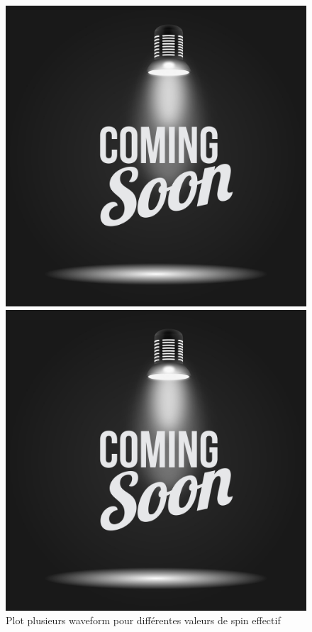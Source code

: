\begin{figure}
\begin{minipage}{0.45\linewidth}
    \includegraphics[width=\linewidth]{placeholder.png}
    \caption{Plot plusieurs waveform pour différentes valeurs de spin effectif}
    \label{fig:waveform_spinEff}
  \end{minipage}
  \hfill
  \begin{minipage}{0.45\linewidth}
    \includegraphics[width=\linewidth]{placeholder.png}

\end{minipage}
\end{figure}
